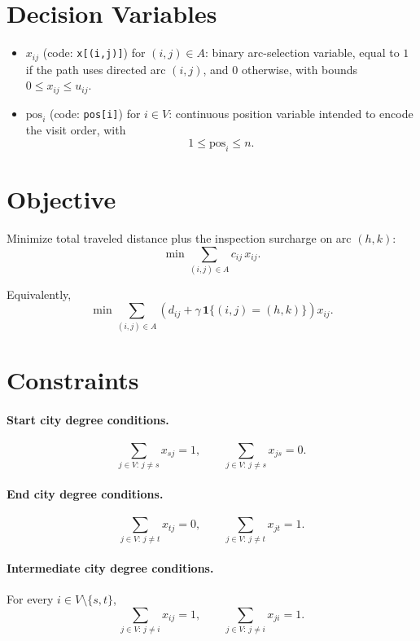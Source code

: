 \section*{Decision Variables}

\begin{itemize}
\item $x_{ij}$ (code: \texttt{x[(i,j)]}) for $(i,j)\in A$: binary arc-selection variable, equal to $1$ if the path uses directed arc $(i,j)$, and $0$ otherwise, with bounds $0 \le x_{ij} \le u_{ij}$.
\item $\mathrm{pos}_i$ (code: \texttt{pos[i]}) for $i\in V$: continuous position variable intended to encode the visit order, with
\[
1 \le \mathrm{pos}_i \le n.
\]
\end{itemize}

\section*{Objective}

Minimize total traveled distance plus the inspection surcharge on arc $(h,k)$:
\[
\min \sum_{(i,j)\in A} c_{ij}\,x_{ij}.
\]

Equivalently,
\[
\min \sum_{(i,j)\in A} \left(d_{ij}+\gamma \,\mathbf{1}\{(i,j)=(h,k)\}\right)x_{ij}.
\]

\section*{Constraints}

\paragraph{Start city degree conditions.}
\[
\sum_{j\in V:\, j\neq s} x_{sj} = 1,
\qquad
\sum_{j\in V:\, j\neq s} x_{js} = 0.
\]

\paragraph{End city degree conditions.}
\[
\sum_{j\in V:\, j\neq t} x_{tj} = 0,
\qquad
\sum_{j\in V:\, j\neq t} x_{jt} = 1.
\]

\paragraph{Intermediate city degree conditions.}
For every $i\in V\setminus\{s,t\}$,
\[
\sum_{j\in V:\, j\neq i} x_{ij} = 1,
\qquad
\sum_{j\in V:\, j\neq i} x_{ji} = 1.
\]

